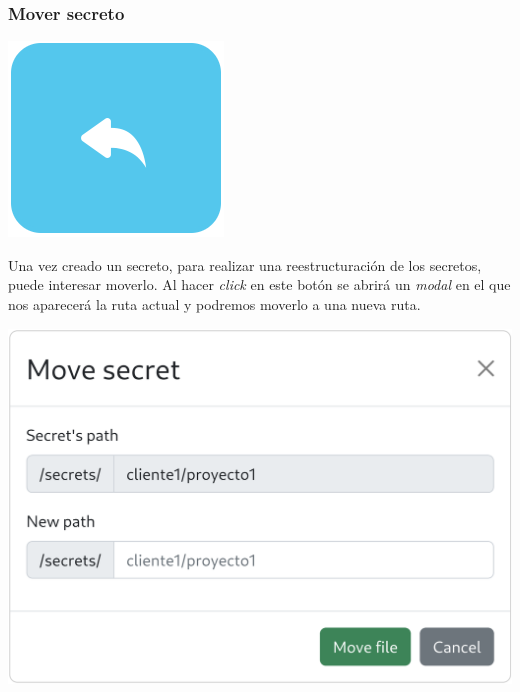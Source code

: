 \documentclass{\ClassPath/viu-tfm-template}
\begin{document}
\subsubsection*{Mover secreto}
{
\begin{minipage}{0.1\linewidth}
    \includegraphics[width=\linewidth]{img/move.png}
\end{minipage}
\hspace{0.5cm}
\begin{minipage}{0.9\linewidth}
    Una vez creado un secreto, para realizar una reestructuración de los secretos, puede interesar moverlo. Al hacer \textit{click} en este botón se abrirá un \textit{modal} en el que nos aparecerá la ruta actual y podremos moverlo a una nueva ruta.
\end{minipage}
}
\vspace{-8pt}
\begin{center}
    \includegraphics[width=0.56\linewidth]{img/move-modal.png}
\end{center}
\end{document}
